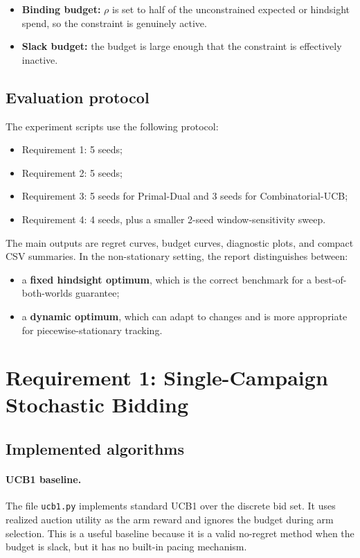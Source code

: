 \documentclass[11pt,a4paper]{article}
\begin{document}
\begin{itemize}
  \item \textbf{Binding budget:} $\rho$ is set to half of the unconstrained
  expected or hindsight spend, so the constraint is genuinely active.
  \item \textbf{Slack budget:} the budget is large enough that the constraint is
  effectively inactive.
\end{itemize}

\subsection{Evaluation protocol}

The experiment scripts use the following protocol:

\begin{itemize}
  \item Requirement 1: 5 seeds;
  \item Requirement 2: 5 seeds;
  \item Requirement 3: 5 seeds for Primal-Dual and 3 seeds for
  Combinatorial-UCB;
  \item Requirement 4: 4 seeds, plus a smaller 2-seed window-sensitivity sweep.
\end{itemize}

The main outputs are regret curves, budget curves, diagnostic plots, and compact
CSV summaries. In the non-stationary setting, the report distinguishes between:

\begin{itemize}
  \item a \textbf{fixed hindsight optimum}, which is the correct benchmark for a
  best-of-both-worlds guarantee;
  \item a \textbf{dynamic optimum}, which can adapt to changes and is more
  appropriate for piecewise-stationary tracking.
\end{itemize}

\section{Requirement 1: Single-Campaign Stochastic Bidding}

\subsection{Implemented algorithms}

\paragraph{UCB1 baseline.}
The file \texttt{ucb1.py} implements standard UCB1 over the discrete bid set. It
uses realized auction utility as the arm reward and ignores the budget during
arm selection. This is a useful baseline because it is a valid no-regret method
when the budget is slack, but it has no built-in pacing mechanism.
\end{document}
